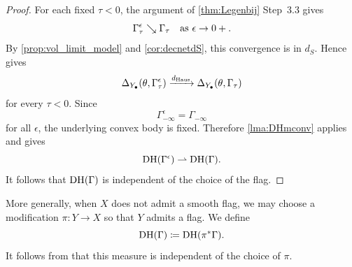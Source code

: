\begin{proof}
For each fixed $\tau<0$, the argument of \cref{thm:Legenbij} Step~3.3 gives
\[
    \Gamma^\epsilon_\tau\searrow \Gamma_\tau \quad\textup{as }\epsilon\to 0+.
\]
By \cref{prop:vol_limit_model} and \cref{cor:decnetdS}, this convergence is in $d_S$. Hence  gives
\[
    \Delta_{Y_\bullet}(\theta,\Gamma^\epsilon_\tau)\xrightarrow{d_{\mathrm{Haus}}}\Delta_{Y_\bullet}(\theta,\Gamma_\tau)
\]
for every $\tau<0$. Since
\[
    \Gamma^\epsilon_{-\infty}=\Gamma_{-\infty}
\]
for all $\epsilon$, the underlying convex body is fixed. Therefore \cref{lma:DHmconv} applies and gives
\[
    \operatorname{DH}(\Gamma^\epsilon)\rightharpoonup\operatorname{DH}(\Gamma).
\]
It follows that $\operatorname{DH}(\Gamma)$ is independent of the choice of the flag.
\end{proof}

More generally, when $X$ does not admit a smooth flag, we may choose a modification $\pi\colon Y\rightarrow X$ so that $Y$ admits a flag. We define
\begin{equation}\label{eq:DHmgeneral}
\operatorname{DH}(\Gamma)\coloneqq \operatorname{DH}(\pi^*\Gamma).
\end{equation}
It follows from  that this measure is independent of the choice of $\pi$.


